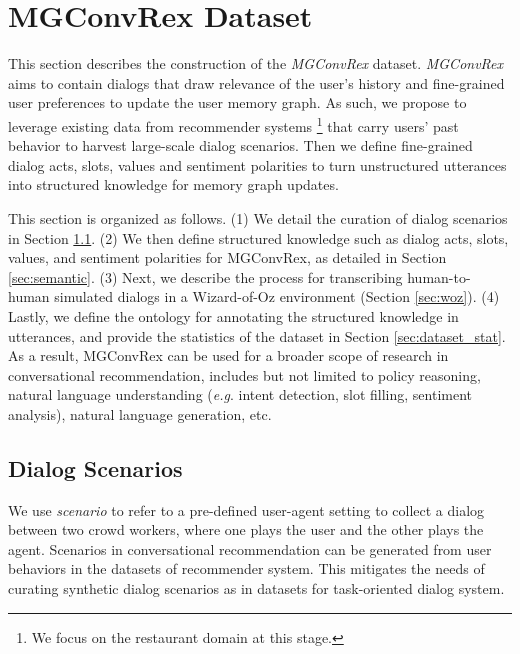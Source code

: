 \documentclass[11pt,a4paper]{article}
\makeatletter
\DeclareRobustCommand\onedot{\futurelet\@let@token\@onedot}
\def\onedot{. }
\def\eg{\emph{e.g}\onedot} \def\Eg{\emph{E.g}\onedot}
\makeatother
\begin{document}
\section{MGConvRex Dataset}
\label{sec:dataset}

This section describes the construction of the \textit{MGConvRex} dataset.
\textit{MGConvRex} aims to contain dialogs that draw relevance of the user's history and fine-grained user preferences to update the user memory graph.
As such, we propose to leverage existing data from recommender systems \footnote{We focus on the restaurant domain at this stage.} that carry users' past behavior to harvest large-scale dialog scenarios.
Then we define fine-grained dialog acts, slots, values and sentiment polarities to turn unstructured utterances into structured knowledge for memory graph updates.

This section is organized as follows.
(1) We detail the curation of dialog scenarios in Section \ref{sec:scenario}.
(2) We then define structured knowledge such as dialog acts, slots, values, and sentiment polarities for MGConvRex, as detailed in Section \ref{sec:semantic}.
(3) Next, we describe the process for transcribing human-to-human simulated dialogs in a Wizard-of-Oz environment \cite{dstc2,woz,multiwoz,multiwoz2.1} (Section \ref{sec:woz}).
(4) Lastly, we define the ontology for annotating the structured knowledge in utterances, and provide the statistics of the dataset in Section \ref{sec:dataset_stat}.
As a result, MGConvRex can be used for a broader scope of research in conversational recommendation, includes but not limited to policy reasoning, natural language understanding (\eg intent detection, slot filling, sentiment analysis), natural language generation, etc.

\subsection{Dialog Scenarios}
\label{sec:scenario}
We use \textit{scenario} to refer to a pre-defined user-agent setting to collect a dialog between two crowd workers, where one plays the user and the other plays the agent. 
Scenarios in conversational recommendation can be generated from user behaviors in the datasets of recommender system.
This mitigates the needs of curating synthetic dialog scenarios as in datasets for task-oriented dialog system\cite{li2016user,li2018microsoft}.
\end{document}
